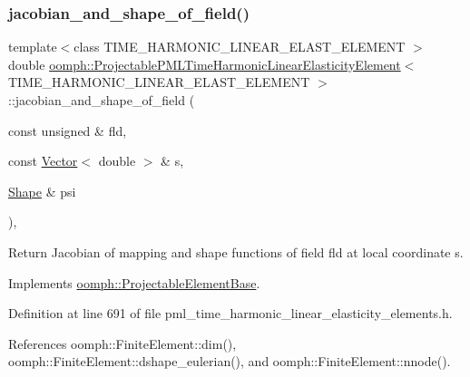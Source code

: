 \subsubsection{\texorpdfstring{jacobian\+\_\+and\+\_\+shape\+\_\+of\+\_\+field()}{jacobian\_and\_shape\_of\_field()}}
{\footnotesize\ttfamily template$<$class T\+I\+M\+E\+\_\+\+H\+A\+R\+M\+O\+N\+I\+C\+\_\+\+L\+I\+N\+E\+A\+R\+\_\+\+E\+L\+A\+S\+T\+\_\+\+E\+L\+E\+M\+E\+NT $>$ \\
double \hyperlink{classoomph_1_1ProjectablePMLTimeHarmonicLinearElasticityElement}{oomph\+::\+Projectable\+P\+M\+L\+Time\+Harmonic\+Linear\+Elasticity\+Element}$<$ T\+I\+M\+E\+\_\+\+H\+A\+R\+M\+O\+N\+I\+C\+\_\+\+L\+I\+N\+E\+A\+R\+\_\+\+E\+L\+A\+S\+T\+\_\+\+E\+L\+E\+M\+E\+NT $>$\+::jacobian\+\_\+and\+\_\+shape\+\_\+of\+\_\+field (\begin{DoxyParamCaption}\item[{const unsigned \&}]{fld,  }\item[{const \hyperlink{classoomph_1_1Vector}{Vector}$<$ double $>$ \&}]{s,  }\item[{\hyperlink{classoomph_1_1Shape}{Shape} \&}]{psi }\end{DoxyParamCaption})\hspace{0.3cm}{\ttfamily [inline]}, {\ttfamily [virtual]}}



Return Jacobian of mapping and shape functions of field fld at local coordinate s. 



Implements \hyperlink{classoomph_1_1ProjectableElementBase_ad45c21b58c0985d52f68ab2d79cbb488}{oomph\+::\+Projectable\+Element\+Base}.



Definition at line 691 of file pml\+\_\+time\+\_\+harmonic\+\_\+linear\+\_\+elasticity\+\_\+elements.\+h.



References oomph\+::\+Finite\+Element\+::dim(), oomph\+::\+Finite\+Element\+::dshape\+\_\+eulerian(), and oomph\+::\+Finite\+Element\+::nnode().

\mbox{\label{classoomph_1_1ProjectablePMLTimeHarmonicLinearElasticityElement_a7459a06e5c3dd6a91286408e8d407bf8}} 
